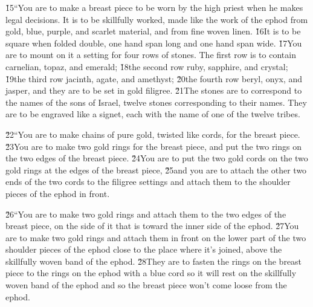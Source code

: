 \v{15}``You are to make a breast piece to be worn by the high priest when he makes legal decisions. It is to be skillfully worked, made like the work of the ephod from gold, blue, purple, and scarlet material, and from fine woven linen. \v{16}It is to be square when folded double, one hand span long and one hand span wide. \v{17}You are to mount on it a setting for four rows of stones. The first row is to contain carnelian, topaz, and emerald; \v{18}the second row ruby, sapphire, and crystal; \v{19}the third row jacinth, agate, and amethyst; \v{20}the fourth row beryl, onyx, and jasper, and they are to be set in gold filigree. \v{21}The stones are to correspond to the names of the sons of Israel, twelve stones corresponding to their names. They are to be engraved like a signet, each with the name of one of the twelve tribes.

\v{22}``You are to make chains of pure gold, twisted like cords, for the breast piece. \v{23}You are to make two gold rings for the breast piece, and put the two rings on the two edges of the breast piece. \v{24}You are to put the two gold cords on the two gold rings at the edges of the breast piece, \v{25}and you are to attach the other two ends of the two cords to the filigree settings and attach them to the shoulder pieces of the ephod in front.

\v{26}``You are to make two gold rings and attach them to the two edges of the breast piece, on the side of it that is toward the inner side of the ephod. \v{27}You are to make two gold rings and attach them in front on the lower part of the two shoulder pieces of the ephod close to the place where it's joined, above the skillfully woven band of the ephod. \v{28}They are to fasten the rings on the breast piece to the rings on the ephod with a blue cord so it will rest on the skillfully woven band of the ephod and so the breast piece won't come loose from the ephod.

